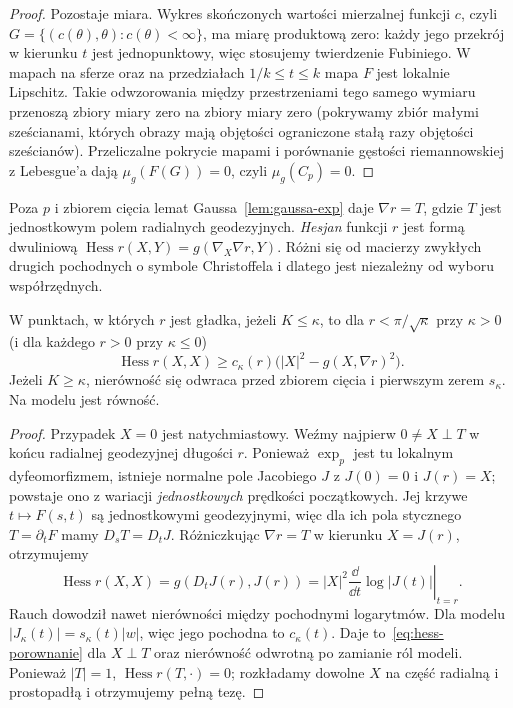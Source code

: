 \begin{proof}
Pozostaje miara. Wykres skończonych wartości mierzalnej
funkcji $c$, czyli $G=\{(c(\theta),\theta):c(\theta)<\infty\}$,
ma miarę produktową zero: każdy jego przekrój w kierunku
$t$ jest jednopunktowy, więc stosujemy twierdzenie Fubiniego.
W mapach na sferze oraz na przedziałach
$1/k\leq t\leq k$ mapa $F$ jest lokalnie Lipschitz.
Takie odwzorowania między przestrzeniami tego samego
wymiaru przenoszą zbiory miary zero na zbiory miary zero
(pokrywamy zbiór małymi sześcianami, których obrazy
mają objętości ograniczone stałą razy objętości sześcianów).
Przeliczalne pokrycie mapami i porównanie gęstości
riemannowskiej z Lebesgue'a dają $\mu_g(F(G))=0$,
czyli $\mu_g(C_p)=0$.
\end{proof}

Poza $p$ i zbiorem cięcia lemat
Gaussa~\ref{lem:gaussa-exp} daje
$\nabla r=T$, gdzie $T$ jest jednostkowym
polem radialnych geodezyjnych. \emph{Hesjan}
funkcji $r$ jest formą dwuliniową
$\operatorname{Hess}r(X,Y)=g(\nabla_X\nabla r,Y)$.
Różni się od macierzy zwykłych drugich pochodnych
o symbole Christoffela i dlatego jest
niezależny od wyboru współrzędnych.

\begin{wniosek}
\label{cor:hess-odleglosc-porownanie}
W punktach, w których $r$ jest gładka,
jeżeli $K\leq\kappa$, to dla
$r<\pi/\sqrt\kappa$ przy $\kappa>0$
(i dla każdego $r>0$ przy $\kappa\leq0$)
\begin{equation}\label{eq:hess-porownanie}
 \operatorname{Hess}r(X,X)
 \geq c_\kappa(r)
       \bigl(|X|^2-g(X,\nabla r)^2\bigr).
\end{equation}
Jeżeli $K\geq\kappa$, nierówność się odwraca
przed zbiorem cięcia i pierwszym zerem
$s_\kappa$. Na modelu jest równość.
\end{wniosek}
\begin{proof}
Przypadek $X=0$ jest natychmiastowy. Weźmy najpierw
$0\ne X\perp T$ w końcu radialnej
geodezyjnej długości $r$. Ponieważ $\exp_p$
jest tu lokalnym dyfeomorfizmem, istnieje
normalne pole Jacobiego $J$ z $J(0)=0$
i $J(r)=X$; powstaje ono z wariacji
\emph{jednostkowych} prędkości początkowych.
Jej krzywe $t\mapsto F(s,t)$ są jednostkowymi
geodezyjnymi, więc dla ich pola stycznego
$T=\partial_tF$ mamy $D_sT=D_tJ$.
Różniczkując $\nabla r=T$ w kierunku
$X=J(r)$, otrzymujemy
\begin{equation}\label{eq:hess-jacobi}
 \operatorname{Hess}r(X,X)
 =g(D_tJ(r),J(r))
 =|X|^2\left.\frac{\dd}{\dd t}
               \log|J(t)|\right|_{t=r}.
\end{equation}
Rauch dowodził nawet nierówności między
pochodnymi logarytmów. Dla modelu
$|J_{\kappa}(t)|=s_\kappa(t)|w|$,
więc jego pochodna to $c_\kappa(t)$.
Daje to~\eqref{eq:hess-porownanie}
dla $X\perp T$ oraz nierówność odwrotną
po zamianie ról modeli. Ponieważ $|T|=1$,
$\operatorname{Hess}r(T,\cdot)=0$;
rozkładamy dowolne $X$ na część radialną
i prostopadłą i otrzymujemy pełną tezę.
\end{proof}

